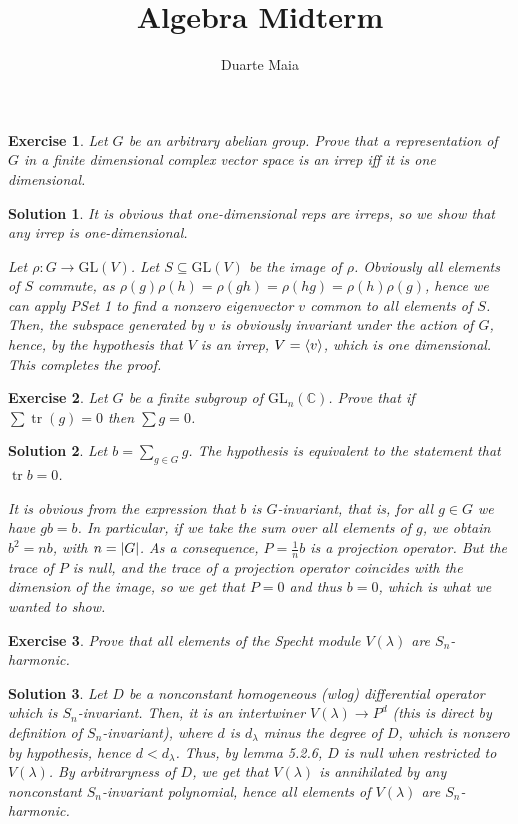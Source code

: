 \documentclass{article}
\title{Algebra Midterm}
\author{Duarte Maia}
\newtheorem{ex}{Exercise}
\theoremstyle{nonumberplain}
\newtheorem{sol}{Solution}
\newcommand{\C}{\mathbb{C}}
\DeclareMathOperator{\trace}{tr}
\newcommand{\GL}{\mathrm{GL}}
\DeclarePairedDelimiter{\abs}{\lvert}{\rvert}
\DeclarePairedDelimiter{\braket}{\langle}{\rangle}
\begin{document}
\maketitle

\begin{ex}
Let $G$ be an arbitrary abelian group. Prove that a representation of $G$ in a finite dimensional complex vector space is an irrep iff it is one dimensional.
\end{ex}

\begin{sol}
It is obvious that one-dimensional reps are irreps, so we show that any irrep is one-dimensional.

Let $\rho \colon G \to \GL(V)$. Let $S \subseteq \GL(V)$ be the image of $\rho$. Obviously all elements of $S$ commute, as $\rho(g) \rho(h) = \rho(gh) = \rho(hg) = \rho(h) \rho(g)$, hence we can apply PSet 1 to find a nonzero eigenvector $v$ common to all elements of $S$. Then, the subspace generated by $v$ is obviously invariant under the action of $G$, hence, by the hypothesis that $V$ is an irrep, $V = \braket{v}$, which is one dimensional. This completes the proof.
\end{sol}

\pagebreak

\begin{ex}
Let $G$ be a finite subgroup of $\GL_n(\C)$. Prove that if $\sum \trace(g) = 0$ then $\sum g = 0$.
\end{ex}

\begin{sol}
Let $b = \sum_{g \in G} g$. The hypothesis is equivalent to the statement that $\trace b = 0$.

It is obvious from the expression that $b$ is $G$-invariant, that is, for all $g \in G$ we have $gb = b$. In particular, if we take the sum over all elements of $g$, we obtain $b^2 = n b$, with $n = \abs{G}$. As a consequence, $P = \frac1n b$ is a projection operator. But the trace of $P$ is null, and the trace of a projection operator coincides with the dimension of the image, so we get that $P = 0$ and thus $b = 0$, which is what we wanted to show.
\end{sol}

\pagebreak

\begin{ex}
Prove that all elements of the Specht module $V(\lambda)$ are $S_n$-harmonic.
\end{ex}

\begin{sol}
Let $D$ be a nonconstant homogeneous (wlog) differential operator which is $S_n$-invariant. Then, it is an intertwiner $V(\lambda) \to P^d$ (this is direct by definition of $S_n$-invariant), where $d$ is $d_\lambda$ minus the degree of $D$, which is nonzero by hypothesis, hence $d < d_\lambda$. Thus, by lemma 5.2.6, $D$ is null when restricted to $V(\lambda)$. By arbitraryness of $D$, we get that $V(\lambda)$ is annihilated by any nonconstant $S_n$-invariant polynomial, hence all elements of $V(\lambda)$ are $S_n$-harmonic.
\end{sol}
\end{document}
